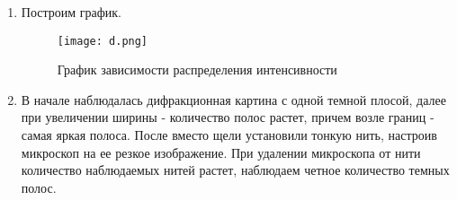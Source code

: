 \documentclass[a4paper]{article}
\begin{document}
\begin{enumerate}
	\item Построим график.
	
	\begin{figure}[H]
		\begin{center}
		\label{graf_a}
		\texttt{[image: d.png]}
		\caption{График зависимости распределения интенсивности}
		\end{center}
	\end{figure}

	\item В начале наблюдалась дифракционная картина с одной темной плосой, далее при увеличении ширины - количество полос растет, причем возле границ - самая яркая полоса. После вместо щели установили тонкую нить, настроив микроскоп на ее резкое изображение. При удалении микроскопа от нити количество наблюдаемых нитей растет, наблюдаем четное количество темных полос.
\end{enumerate}
\end{document}

